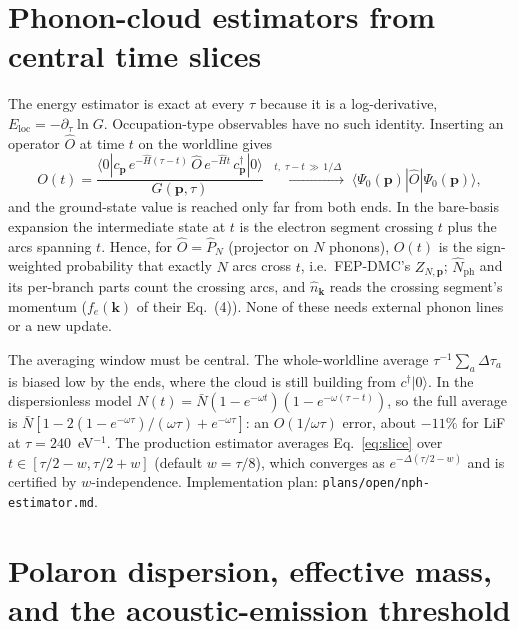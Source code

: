 \documentclass[11pt]{article}
\newcommand{\kv}{\mathbf{k}}
\begin{document}
\section{Phonon-cloud estimators from central time slices}
\label{sec:slice}

The energy estimator is exact at every $\tau$ because it is a log-derivative, $E_{\mathrm{loc}}=-\partial_{\tau}\ln G$. Occupation-type observables have no such identity. Inserting an operator $\hat O$ at time $t$ on the worldline gives
\begin{equation}
  O(t) = \frac{\langle0|c_{\mathbf p}\,e^{-\hat H(\tau-t)}\,\hat O\,e^{-\hat Ht}\,c^{\dagger}_{\mathbf p}|0\rangle}{G(\mathbf p,\tau)}
  \;\xrightarrow{\;t,\;\tau-t\,\gg\,1/\Delta\;}\;\langle\Psi_{0}(\mathbf p)|\hat O|\Psi_{0}(\mathbf p)\rangle ,
  \label{eq:slice}
\end{equation}
and the ground-state value is reached only far from both ends. In the bare-basis expansion the intermediate state at $t$ is the electron segment crossing $t$ plus the arcs spanning $t$. Hence, for $\hat O=\hat P_{N}$ (projector on $N$ phonons), $O(t)$ is the sign-weighted probability that exactly $N$ arcs cross $t$, i.e.\ FEP-DMC's $Z_{N,\mathbf p}$; $\hat N_{\mathrm{ph}}$ and its per-branch parts count the crossing arcs, and $\hat n_{\kv}$ reads the crossing segment's momentum ($f_{e}(\kv)$ of their Eq.~(4)). None of these needs external phonon lines or a new update.

The averaging window must be central. The whole-worldline average $\tau^{-1}\sum_{a}\Delta\tau_{a}$ is biased low by the ends, where the cloud is still building from $c^{\dagger}|0\rangle$. In the dispersionless model $N(t)=\bar N(1-e^{-\omega t})(1-e^{-\omega(\tau-t)})$, so the full average is $\bar N[1-2(1-e^{-\omega\tau})/(\omega\tau)+e^{-\omega\tau}]$: an $O(1/\omega\tau)$ error, about $-11\%$ for LiF at $\tau=240$~eV$^{-1}$. The production estimator averages Eq.~\eqref{eq:slice} over $t\in[\tau/2-w,\tau/2+w]$ (default $w=\tau/8$), which converges as $e^{-\Delta(\tau/2-w)}$ and is certified by $w$-independence. Implementation plan: \texttt{plans/open/nph-estimator.md}.

\section{Polaron dispersion, effective mass, and the acoustic-emission threshold}
\label{sec:dispersion}
\end{document}
